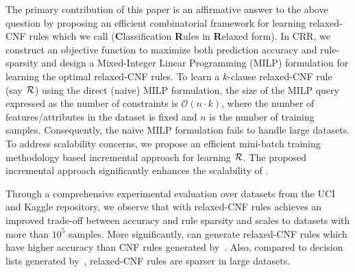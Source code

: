 The primary contribution of this paper is an affirmative answer to the above question by proposing an efficient combinatorial framework for learning relaxed-CNF rules which we call {\crr} (\textbf{C}lassification \textbf{R}ules in \textbf{R}elaxed form).  In CRR, we construct an objective function to maximize both prediction accuracy and rule-sparsity and design a  Mixed-Integer Linear Programming (MILP) formulation for learning the optimal relaxed-CNF rules.
To learn a $ k $-clause relaxed-CNF rule (say $ {\mathcal{R}} $) using the direct (naive) MILP formulation, the size of the MILP query expressed as the number of constraints is $ \mathcal{O}(n\cdot k) $, where the  number of features/attributes in the dataset is fixed and $ n $ is the number of training samples. Consequently, the naive MILP formulation fails to handle large datasets. To address scalability concerns,  we propose an efficient mini-batch training methodology based  incremental approach  for learning $ {\mathcal{R}} $. The proposed incremental approach significantly enhances the scalability of {\crr}. 

{Through a comprehensive experimental evaluation over datasets from the UCI and Kaggle repository, we observe that {\crr} with relaxed-CNF rules achieves an improved trade-off between accuracy and rule sparsity and scales to datasets with more than $ 10^5 $ samples. More significantly, {\crr} can generate relaxed-CNF rules which have higher accuracy than CNF rules generated by~\cite{ghosh19incremental}. Also, compared to decision lists generated by~\cite{C1995}, relaxed-CNF rules are sparser in large datasets.}
%


